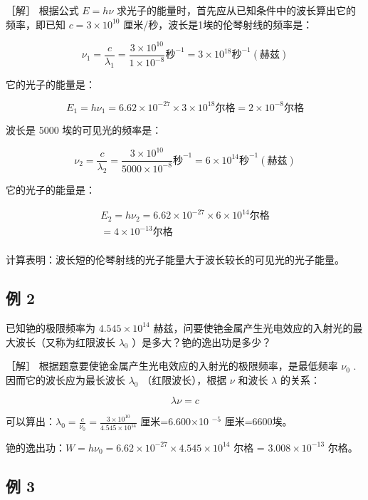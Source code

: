 ［解］ 根据公式 \(E = h\nu\)
求光子的能量时，首先应从已知条件中的波长算出它的频率，即已知
\(c=3\times10^{10}\) 厘米/秒，波长是1埃的伦琴射线的频率是：

\[
\nu_ {1} = \frac {c}{\lambda_ {1}} = \frac {3 \times 10 ^ {10}}{1 \times 10 ^ {- 8}} \text{秒} ^ {- 1} = 3 \times 10 ^ {18} \text{秒} ^ {- 1} (\text{赫兹})
\]

它的光子的能量是：

\[
E _ {1} = h \nu_ {1} = 6.62 \times 10 ^ {- 27} \times 3 \times 10 ^ {18} \text{尔格} = 2 \times 10 ^ {- 8} \text{尔格}
\]

波长是 5000 埃的可见光的频率是：

\[
\nu_ {2} = \frac {c}{\lambda_ {2}} = \frac {3 \times 10 ^ {10}}{5000 \times 10 ^ {- 8}} \text{秒} ^ {- 1} = 6 \times 10 ^ {14} \text{秒} ^ {- 1} (\text{赫兹})
\]

它的光子的能量是：

\[
\begin{array}{l} E _ {2} = h \nu_ {2} = 6.62 \times 10 ^ {- 27} \times 6 \times 10 ^ {14} \text{尔格} \\ = 4 \times 10 ^ {- 13} \text{尔格} \\ \end{array}
\]

计算表明：波长短的伦琴射线的光子能量大于波长较长的可见光的光子能量。

\subsection{例 2}

已知铯的极限频率为 \(4.545 \times 10^{14}\)
赫兹，问要使铯金属产生光电效应的入射光的最大波长（又称为红限波长
\(\lambda_{0}\) ）是多大？铯的逸出功是多少？

［解］ 根据题意要使铯金属产生光电效应的入射光的极限频率，是最低频率
\(\nu_{0}\) . 因而它的波长应为最长波长 \(\lambda_{0}\)
（红限波长），根据 \(\nu\) 和波长 \(\lambda\) 的关系：

\[
\lambda \nu = c
\]

可以算出：\(\lambda_{0}=\frac{c}{\nu_{0}}=\frac{3\times10^{10}}{4.545\times10^{14}}\)
厘米=6.600×10 \(^{-5}\) 厘米=6600埃。

铯的逸出功：\(W = h\nu_{0} = 6.62 \times 10^{-27} \times 4.545 \times 10^{14}\)
尔格 = \(3.008 \times 10^{-13}\) 尔格。

\subsection{例 3}

